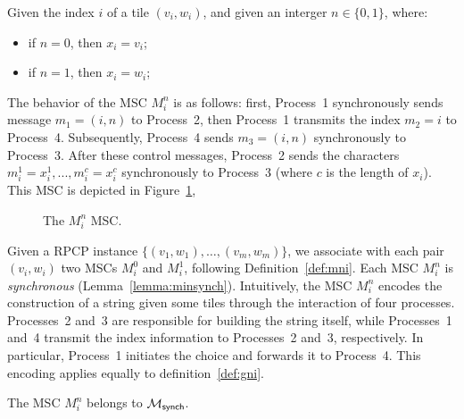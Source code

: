 \begin{definition}[$M^n_i$]\label{def:mni}
	Given the index $i$ of a tile $(v_i, w_i)$, and
	given an interger $n\in\{0,1\}$, where:
	\begin{itemize}
		\item if $n=0$, then $x_i=v_i$;
		\item if $n=1$, then $x_i=w_i$;
	\end{itemize}
	The behavior of the MSC $M^n_i$ is as follows:
	first, Process~1 synchronously sends message
	$m_1 = (i, n)$ to Process~2, then Process~1 transmits the index $m_2=i$
	to Process~4. Subsequently, Process~4 sends $m_3 = (i, n)$
	synchronously to Process~3. After these control messages, Process~2
	sends the characters $m_i^1 = x_i^1,..., m_i^c = x_i^c$
	synchronously to Process~3 (where $c$ is the length of $x_i$).
	This MSC is depicted in Figure~\ref{fig:mni}, 

	\begin{figure}[!ht]
		\centering
		\begin{msc}[draw frame=none, draw head=none, msc keyword=, head height=0px, label distance=0.5ex, foot height=0px, foot distance=0px]{}

		\end{msc}
		\caption{The $M_i^n$ MSC.}
		\label{fig:mni}
	\end{figure}

\end{definition}

Given a RPCP instance $\{(v_1,w_1),\ldots,(v_m,w_m)\}$, we associate  
with each pair $(v_i,w_i)$ two MSCs $M^0_i$ and $M^1_i$, following  
Definition~\ref{def:mni}. Each MSC $M^n_i$ is \emph{synchronous}  
(Lemma~\ref{lemma:minsynch}). Intuitively, the MSC $M_i^n$ encodes the  
construction of a string given some tiles through the interaction of four processes.  
Processes~2 and~3 are responsible for building the string itself,  
while Processes~1 and~4 transmit the index information to Processes~2  
and~3, respectively. In particular, Process~1 initiates the choice and  
forwards it to Process~4. This encoding applies equally to definition~\ref{def:gni}.

\bigskip

\begin{lemma}\label{lemma:minsynch}
The MSC $M_i^n$ belongs to $\mathcal{M}_{\mathsf{synch}}$.
\end{lemma}

